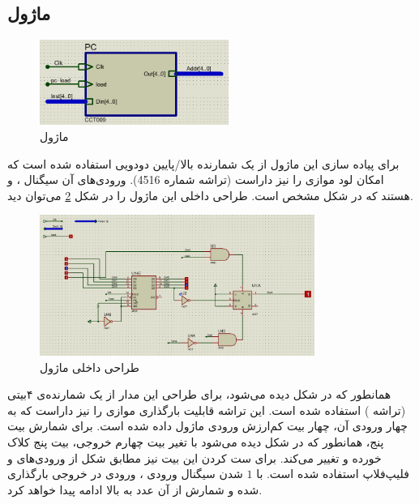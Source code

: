 \documentclass[12pt,onecolumn,a4paper,fleqn]{article}
\begin{document}
	\subsection{ماژول }
	\begin{figure}[H]
		\centering
		\includegraphics[width=0.55\textwidth]{source/pc_interface.png}
		\caption{ماژول }
		\label{fig:3}
	\end{figure}
	برای پیاده سازی این ماژول از یک شمارنده بالا/پایین دودویی استفاده شده است که امکان لود موازی را نیز داراست (تراشه شماره 4516). ورودی‌های آن سیگنال
	،
	و
	هستند که در شکل مشخص است. طراحی داخلی این ماژول را در شکل \ref{fig:pc-inner} می‌توان دید.
	\begin{figure}[H]
		\centering
		\includegraphics[width=0.8\textwidth]{source/pc_inner.png}
		\caption{طراحی داخلی ماژول }
		\label{fig:pc-inner}
	\end{figure}
	همانطور که در شکل دیده می‌شود، برای طراحی این مدار از یک شمارنده‌ی ۴بیتی (تراشه ‌) استفاده شده است. این تراشه قابلیت بارگذاری موازی را نیز داراست که به چهار ورودی آن، چهار بیت کم‌ارزش ورودی ماژول داده شده است. برای شمارش بیت پنج، همانطور که در شکل دیده می‌شود با تغیر بیت چهارم خروجی، بیت پنج کلاک خورده و تغییر می‌کند. برای ست کردن این بیت نیز مطابق شکل از ورودی‌های  و  فلیپ‌فلاپ استفاده شده است. با $1$ شدن سیگنال ورودی ، ورودی در خروجی بارگذاری شده و شمارش از آن عدد به بالا ادامه پیدا خواهد کرد.
\end{document}
